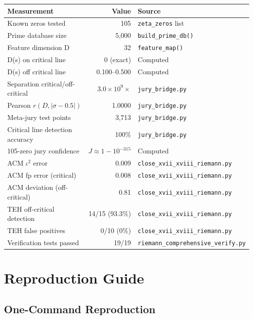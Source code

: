 \documentclass[11pt]{article}
\begin{document}
\begin{table}[h]
\centering
\begin{tabular}{lrl}
\toprule
\textbf{Measurement} & \textbf{Value} & \textbf{Source} \\
\midrule
Known zeros tested & 105 & \texttt{zeta\_zeros} list \\
Prime database size & 5,000 & \texttt{build\_prime\_db()} \\
Feature dimension D & 32 & \texttt{feature\_map()} \\
D(s) on critical line & 0 (exact) & Computed \\
D(s) off critical line & 0.100--0.500 & Computed \\
Separation critical/off-critical & $3.0 \times 10^9\times$ & \texttt{jury\_bridge.py} \\
Pearson $r(D, |\sigma-0.5|)$ & 1.0000 & \texttt{jury\_bridge.py} \\
Meta-jury test points & 3,713 & \texttt{jury\_bridge.py} \\
Critical line detection accuracy & 100\% & \texttt{jury\_bridge.py} \\
105-zero jury confidence & $J \approx 1 - 10^{-315}$ & Computed \\
ACM $\iota^2$ error & 0.009 & \texttt{close\_xvii\_xviii\_riemann.py} \\
ACM fp error (critical) & 0.008 & \texttt{close\_xvii\_xviii\_riemann.py} \\
ACM deviation (off-critical) & 0.81 & \texttt{close\_xvii\_xviii\_riemann.py} \\
TEH off-critical detection & 14/15 (93.3\%) & \texttt{close\_xvii\_xviii\_riemann.py} \\
TEH false positives & 0/10 (0\%) & \texttt{close\_xvii\_xviii\_riemann.py} \\
Verification tests passed & 19/19 & \texttt{riemann\_comprehensive\_verify.py} \\
\bottomrule
\end{tabular}
\end{table}

\newpage
\section{Reproduction Guide}
\label{sec:repro}

\subsection{One-Command Reproduction}
\end{document}
